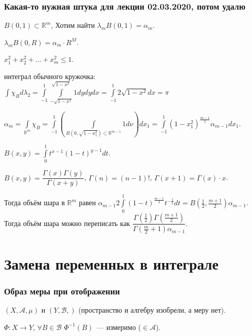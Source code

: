 \documentclass{article}
\begin{document}
    \section{Какая-то нужная штука для лекции 02.03.2020, потом удалю}
    
        $B(0, 1) \subset \mathbb{R}^m$, Хотим найти $\lambda_m B(0, 1) = \alpha_m$.
    
        $\lambda_m B(0, R) = \alpha_m \cdot R^M$.
    
        $x_1^2 + x_2^2 + \ldots + x_m^2 \leqslant 1$.
    
        интеграл обычного кружочка: $\int \chi_B d \lambda_2 = \int\limits^1_{-1} \int\limits^{\sqrt{1 - x^2}}_{-\sqrt{1 - x^2}} 1 dy dy dx = \int\limits^1_{-1} 2 \sqrt{1 - x^2} dx = \pi$
    
        $\alpha_m = \int\limits_{\mathbb{R}^m} \chi_B = \int\limits^1_{-1} \left( \int\limits_{B(0, \sqrt{1 - x_1^2}) \subset \mathbb{R}^{m -1}} 1 d \nu \right) dx_1 = \int\limits^1_{-1} (1 - x_1^2)^{\frac{m - 1}{2}} \alpha_{m - 1} d x_1$.
    
        $B(x, y) = \int\limits^1_0 t^{x - 1} (1 - t)^{y - 1} dt$.
    
        $B(x, y) = \dfrac{\Gamma(x) \Gamma(y)}{\Gamma(x + y)}$, $\Gamma(n) = (n - 1)!$, $\Gamma(x + 1) = \Gamma(x) \cdot x$.
    
        Тогда объём шара в $\mathbb{R}^m$ равен $\alpha_{m - 1} 2 \int\limits^1_0 (1 - t)^{\frac{m - 1}{2}} t^{-\frac{1}{2}} dt = B(\frac{1}{2}, \frac{m + 1}{2}) \alpha_{m - 1}$. Тогда объём шара можно переписать как $\dfrac{\Gamma (\frac{1}{2}) \Gamma (\frac{m + 1}{2})}{\Gamma (\frac{m}{2} + 1) \alpha_{m - 1}}$.
    
\newpage

\part{Замена переменных в интеграле}

\newpage

    \section{Образ меры при отображении}
    
        $(X, \mathcal{A}, \mu)$ и $(Y, \mathcal{B}, )$ (пространство и алгебру изобрели, а меру нет).
    
        $\Phi : X \rightarrow Y$, $\forall B \in \mathcal{B}$ $\Phi^{-1}(B)$~--- измеримо ($\in \mathcal{A}$).
    
\end{document}
